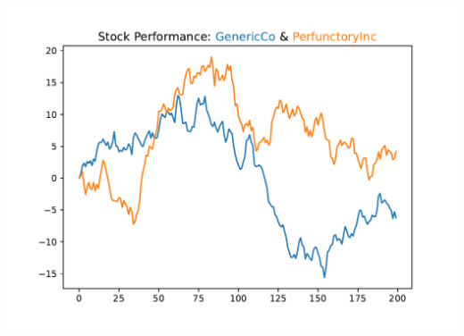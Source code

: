 
\begin{center}
    \includegraphics[width = .7\textwidth]{figures/proseplots/multicolor-title.pdf}
\end{center}

